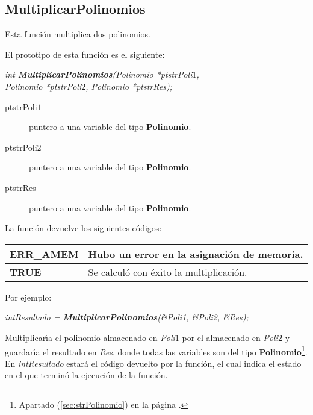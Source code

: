 \subsection{MultiplicarPolinomios}

Esta funci\'on multiplica dos polinomios.\newline

El prototipo de esta funci\'on es el siguiente:

\begin{center}
\emph{int \textbf{MultiplicarPolinomios}(Polinomio *ptstrPoli$1$,\\
Polinomio *ptstrPoli$2$, Polinomio *ptstrRes);}
\end{center}

\begin{description}
\item[ptstrPoli$1$] puntero a una variable del tipo \textbf{Polinomio}. 
\item[ptstrPoli$2$] puntero a una variable del tipo \textbf{Polinomio}. 
\item[ptstrRes] puntero a una variable del tipo \textbf{Polinomio}.
\end{description}

La funci\'on devuelve los siguientes c\'odigos:

\begin{center}
\begin{tabular}{|l|l|}
\hline
\textbf{ERR\_AMEM} & Hubo un error en la asignaci\'on de memoria. \\
\hline
\textbf{TRUE} & Se calcul\'o con \'exito la multiplicaci\'on. \\
\hline
\end{tabular}
\end{center}

Por ejemplo:

\begin{center}
\emph{intResultado = \textbf{MultiplicarPolinomios}(\&Poli1, \&Poli2, \&Res);}
\end{center}

Multiplicar\'{\i}a el polinomio almacenado en \emph{Poli$1$} por el almacenado
en \emph{Poli$2$} y guardar\'{\i}a el resultado en \emph{Res}, donde todas las
variables son del tipo \textbf{Polinomio}\footnote{Apartado 
(\ref{sec:strPolinomio}) en la p\'agina \pageref{sec:strPolinomio}.}.\\

En \emph{intResultado} estar\'a el c\'odigo devuelto por la funci\'on, el cual
indica el estado en el que termin\'o la ejecuci\'on de la funci\'on.\newline


